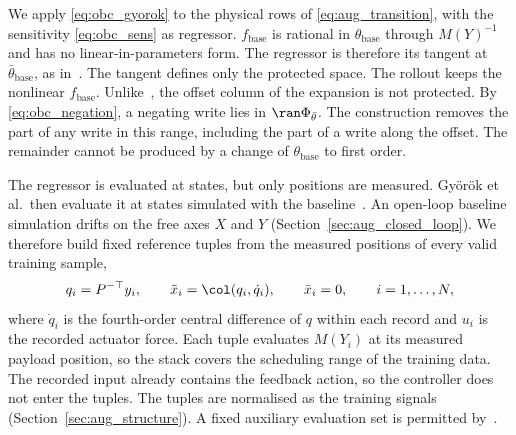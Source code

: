 We apply \eqref{eq:obc_gyorok} to the physical rows of
\eqref{eq:aug_transition}, with the sensitivity \eqref{eq:obc_sens} as
regressor.
$f_{\mathrm{base}}$ is rational in $\theta_{\mathrm{base}}$ through $M(Y)^{-1}$
and has no linear-in-parameters form.
The regressor is therefore its tangent at $\bar\theta_{\mathrm{base}}$, as
in~\cite[Eq.~(15)]{gyorok2025l4dc}.
The tangent defines only the protected space.
The rollout keeps the nonlinear $f_{\mathrm{base}}$.
Unlike~\cite[Eqs.~(17), (18)]{gyorok2025l4dc}, the offset column of the
expansion is not protected.
By \eqref{eq:obc_negation}, a negating write lies in $\ran\Phi_{\bar\theta}$.
The construction removes the part of any write in this range, including the
part of a write along the offset.
The remainder cannot be produced by a change of $\theta_{\mathrm{base}}$ to
first order.

The regressor is evaluated at states, but only positions are measured.
Gy\"or\"ok et al.\ then evaluate it at states simulated with the
baseline~\cite[Sec.~3]{gyorok2025l4dc}.
An open-loop baseline simulation drifts on the free axes $X$ and $Y$
(Section~\ref{sec:aug_closed_loop}).
We therefore build fixed reference tuples from the measured positions of every
valid training sample,
\begin{equation}
 q_i=P^{-\top}y_i,\qquad
 \tilde x_i=\col(q_i,\dot q_i),\qquad
 \bar x_i=0,\qquad i=1,\dots,N,
\label{eq:obc_tuples}
\end{equation}
where $\dot q_i$ is the fourth-order central difference of $q$ within each
record and $u_i$ is the recorded actuator force.
Each tuple evaluates $M(Y_i)$ at its measured payload position, so the stack
covers the scheduling range of the training data.
The recorded input already contains the feedback action, so the controller
does not enter the tuples.
The tuples are normalised as the training signals
(Section~\ref{sec:aug_structure}).
A fixed auxiliary evaluation set is permitted
by~\cite[Sec.~3.2]{gyorok2026obc}.

